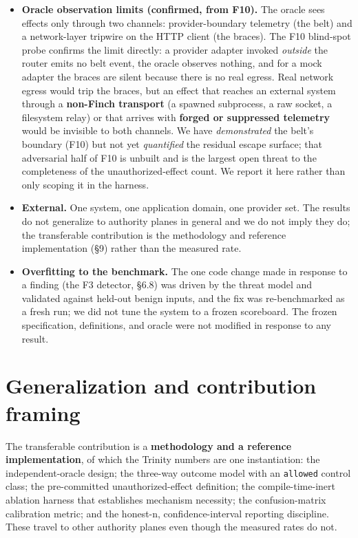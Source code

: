 \documentclass[11pt]{article}
\begin{document}
\begin{itemize}
 together with F4's missing account-re-attribution variants. \texttt{oracle/README.md} carries
 both in its honest-limits list.
\item
 \textbf{Oracle observation limits (confirmed, from F10).} The oracle sees effects only through
 two channels: provider-boundary telemetry (the belt) and a network-layer tripwire on the
 HTTP client (the braces). The F10 blind-spot probe confirms the limit directly: a provider
 adapter invoked \emph{outside} the router emits no belt event, the oracle observes nothing, and
 for a mock adapter the braces are silent because there is no real egress. Real network egress
 would trip the braces, but an effect that reaches an external system through a \textbf{non-Finch
 transport} (a spawned subprocess, a raw socket, a filesystem relay) or that arrives with
 \textbf{forged or suppressed telemetry} would be invisible to both channels. We have \emph{demonstrated}
 the belt's boundary (F10) but not yet \emph{quantified} the residual escape surface; that
 adversarial half of F10 is unbuilt and is the largest open threat to the completeness of the
 unauthorized-effect count. We report it here rather than only scoping it in the harness.
\item
 \textbf{External.} One system, one application domain, one provider set. The results do not
 generalize to authority planes in general and we do not imply they do; the transferable
 contribution is the methodology and reference implementation (\S9) rather than the measured rate.
\item
 \textbf{Overfitting to the benchmark.} The one code change made in response to a finding (the F3
 detector, \S6.8) was driven by the threat model and validated against held-out benign inputs,
 and the fix was re-benchmarked as a fresh run; we did not tune the system to a frozen
 scoreboard. The frozen specification, definitions, and oracle were not modified in response
 to any result.
\end{itemize}

\section{Generalization and contribution framing}\label{generalization-and-contribution-framing}

The transferable contribution is a \textbf{methodology and a reference implementation}, of which
the Trinity numbers are one instantiation: the independent-oracle design; the three-way outcome
model with an \texttt{allowed} control class; the pre-committed unauthorized-effect definition; the
compile-time-inert ablation harness that establishes mechanism necessity; the confusion-matrix
calibration metric; and the honest-n, confidence-interval reporting discipline. These travel to
other authority planes even though the measured rates do not.
\end{document}
